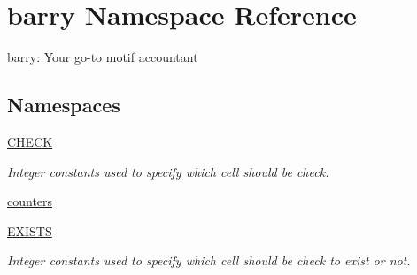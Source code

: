 \hypertarget{namespacebarry}{}\section{barry Namespace Reference}
\label{namespacebarry}


barry\+: Your go-\/to motif accountant  


\subsection*{Namespaces}
\begin{DoxyCompactItemize}
\item 
 \hyperlink{namespacebarry_1_1_c_h_e_c_k}{C\+H\+E\+CK}
\begin{DoxyCompactList}\small\item\em Integer constants used to specify which cell should be check. \end{DoxyCompactList}\item 
 \hyperlink{namespacebarry_1_1counters}{counters}
\item 
 \hyperlink{namespacebarry_1_1_e_x_i_s_t_s}{E\+X\+I\+S\+TS}
\begin{DoxyCompactList}\small\item\em Integer constants used to specify which cell should be check to exist or not. \end{DoxyCompactList}\end{DoxyCompactItemize}
